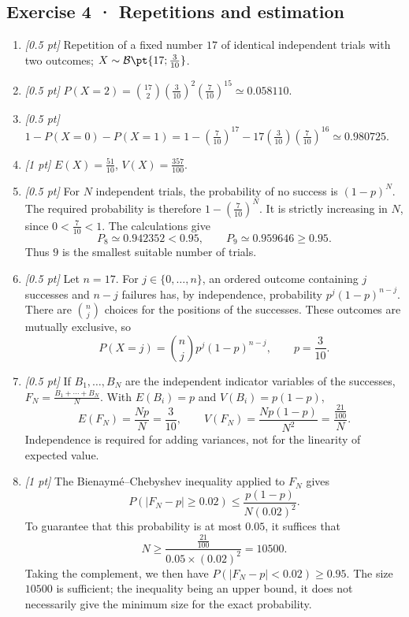 \subsection*{Exercise 4 · Repetitions and estimation}\begin{enumerate}

\item \textit{[0.5 pt]} Repetition of a fixed number $17$ of identical independent trials with two outcomes; $X\sim\mathcal B\pt{17;\frac{3}{10}}$.

\item \textit{[0.5 pt]} $P(X=2)=\binom{17}2(\frac{3}{10})^2(\frac{7}{10})^{15}\simeq\num{0,058110}$.

\item \textit{[0.5 pt]} $1-P(X=0)-P(X=1)=1-(\frac{7}{10})^{17}-17(\frac{3}{10})(\frac{7}{10})^{16}\simeq\num{0,980725}$.

\item \textit{[1 pt]} $E(X)=\frac{51}{10}$, $V(X)=\frac{357}{100}$.

\item \textit{[0.5 pt]} For $N$ independent trials, the probability of no success is $(1-p)^N$. The required probability is therefore $1-(\frac{7}{10})^N$. It is strictly increasing in $N$, since $0<\frac{7}{10}<1$. The calculations give
\[P_{8}\simeq\num{0,942352}<\num{0,95},\qquad P_{9}\simeq\num{0,959646}\ge\num{0,95}.\]
Thus $9$ is the smallest suitable number of trials.

\item \textit{[0.5 pt]} Let $n=17$. For $j\in\{0,\ldots,n\}$, an ordered outcome containing $j$ successes and $n-j$ failures has, by independence, probability $p^j(1-p)^{n-j}$. There are $\binom nj$ choices for the positions of the successes. These outcomes are mutually exclusive, so
\[P(X=j)=\binom nj p^j(1-p)^{n-j},\qquad p=\frac{3}{10}.\]

\item \textit{[0.5 pt]} If $B_1,\ldots,B_N$ are the independent indicator variables of the successes, $F_N=\frac{B_1+\cdots+B_N}{N}$. With $E(B_i)=p$ and $V(B_i)=p(1-p)$,
\[E(F_N)=\frac{Np}{N}=\frac{3}{10},\qquad V(F_N)=\frac{Np(1-p)}{N^2}=\frac{\frac{21}{100}}{N}.\]
Independence is required for adding variances, not for the linearity of expected value.

\item \textit{[1 pt]} The Bienaymé–Chebyshev inequality applied to $F_N$ gives
\[P(|F_N-p|\ge\num{0,02})\le\frac{p(1-p)}{N(\num{0,02})^2}.\]
To guarantee that this probability is at most $\num{0,05}$, it suffices that
\[N\ge\frac{\frac{21}{100}}{\num{0,05}\times(\num{0,02})^2}=10500.\]
Taking the complement, we then have $P(|F_N-p|<\num{0,02})\ge\num{0,95}$. The size $10500$ is sufficient; the inequality being an upper bound, it does not necessarily give the minimum size for the exact probability.

\end{enumerate}

